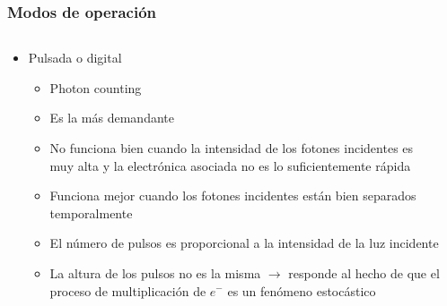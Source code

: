 \documentclass{beamer}
\begin{document}
\begin{frame}
\frametitle{Modos de operación}
\begin{columns}
\begin{column}{0.60\textwidth}
\begin{block}{}
\begin{itemize}
\item Pulsada o digital
\begin{itemize}
\item Photon counting
\item Es la más demandante
\item No funciona bien cuando la intensidad de los fotones incidentes es muy alta y la
electrónica asociada no es lo suficientemente rápida
\item Funciona mejor cuando los fotones incidentes están bien separados temporalmente
\item El número de pulsos es proporcional a la intensidad de la luz incidente  
\item {\color{blue}La altura de los pulsos no es la misma $\rightarrow$ responde al hecho de
que el proceso de multiplicación de $e^-$ es un fenómeno estocástico}
\end{itemize}

\end{itemize}
\end{block}
\end{column} 
\begin{column}{0.40\textwidth}
\begin{center}
\end{center}
\end{column}
\end{columns}
\end{frame} 
\end{document}
